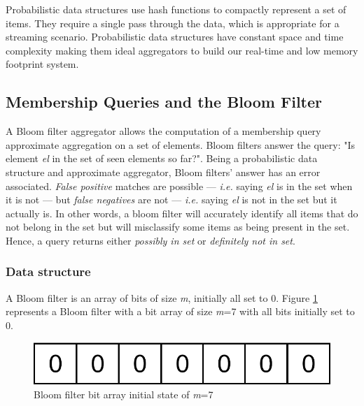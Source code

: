 Probabilistic data structures use hash functions to compactly represent a set of items. They require a single pass through the data, which is appropriate for a streaming scenario. Probabilistic data structures have constant space and time complexity \cite{Singh-PDS-BIGD} making them ideal aggregators to build our real-time and low memory footprint system.


\subsection{Membership Queries and the Bloom Filter}
A Bloom filter \cite{BLOOM-BLOOMFILTER} aggregator allows the computation of a membership query approximate aggregation on a set of elements. Bloom filters answer the query: "Is element \textit{el} in the set of seen elements so far?". Being a probabilistic data structure and approximate aggregator, Bloom filters' answer has an error associated. \textit{False positive} matches are possible --- \textit{i.e.} saying \textit{el} is in the set when it is not --- but \textit{false negatives} are not --- \textit{i.e.} saying \textit{el} is not in the set but it actually is. In other words, a bloom filter will accurately identify all items that do not belong in the set but will misclassify some items as being present in the set. Hence, a query returns either \textit{possibly in set} or \textit{definitely not in set}.

\subsubsection*{Data structure}
A Bloom filter is an array of bits of size \textit{m}, initially all set to 0. Figure \ref{fig:initial-bloom-filter} represents a Bloom filter with a bit array of size \textit{m}=7 with all bits initially set to 0.

\begin{figure}[!htb]
    \begin{center}
      \includegraphics[scale=1.1]{figures/initial-bloom.png}
      \caption[Bloom filter bit array initial state]{Bloom filter bit array initial state of \textit{m}=7}
      \label{fig:initial-bloom-filter}
    \end{center}
\end{figure}

